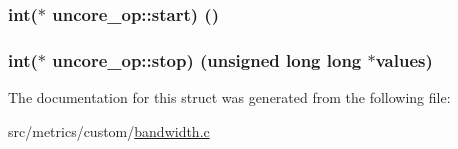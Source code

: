 \subsubsection[{\texorpdfstring{start}{start}}]{\setlength{\rightskip}{0pt plus 5cm}int($\ast$ uncore\+\_\+op\+::start) ()}\hypertarget{structuncore__op_ab2c6085afde0ef4aa7893038e1b36606}{}\label{structuncore__op_ab2c6085afde0ef4aa7893038e1b36606}
\subsubsection[{\texorpdfstring{stop}{stop}}]{\setlength{\rightskip}{0pt plus 5cm}int($\ast$ uncore\+\_\+op\+::stop) (unsigned long long $\ast${\bf values})}\hypertarget{structuncore__op_abd40e6ba8c4083702d5704a921d5f087}{}\label{structuncore__op_abd40e6ba8c4083702d5704a921d5f087}


The documentation for this struct was generated from the following file\+:\begin{DoxyCompactItemize}
\item 
src/metrics/custom/\hyperlink{bandwidth_8c}{bandwidth.\+c}\end{DoxyCompactItemize}
